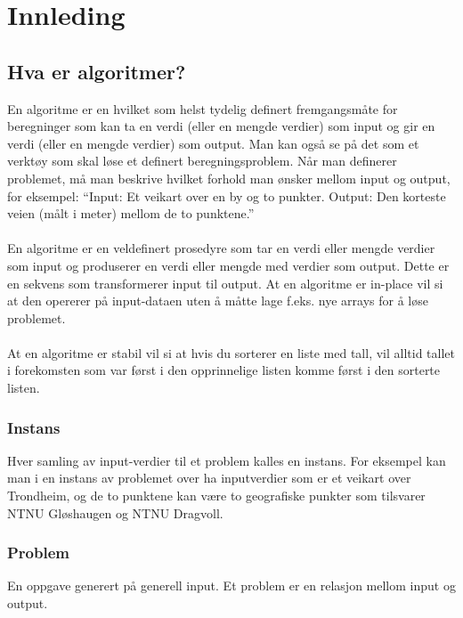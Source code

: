 \section{Innleding}
\newenvironment{boxed}
    {\begin{center}
    \begin{tabular}{|p{0.9\textwidth}|}
    \hline\\
    }
    { 
    \\\\\hline
    \end{tabular} 
    \end{center}
    }
\subsection{Hva er algoritmer?}
En algoritme er en hvilket som helst tydelig definert fremgangsmåte for beregninger som kan ta en verdi (eller en mengde verdier) som input og gir en verdi (eller en mengde verdier) som output. Man kan også se på det som et verktøy som skal løse et definert beregningsproblem. Når man definerer problemet, må man beskrive hvilket forhold man ønsker mellom input og output, for eksempel: “Input: Et veikart over en by og to punkter. Output: Den korteste veien (målt i meter) mellom de to punktene.”
\\\\
En algoritme er en veldefinert prosedyre som tar en verdi eller mengde verdier som input og produserer en verdi eller mengde med verdier som output. Dette er en sekvens som transformerer input til output.
At en algoritme er in-place vil si at den opererer på input-dataen uten å måtte lage f.eks. nye arrays for å løse problemet.
\\\\
At en algoritme er stabil vil si at hvis du sorterer en liste med tall, vil alltid tallet i forekomsten som var først i den opprinnelige listen komme først i den sorterte listen.

\subsubsection{Instans}
Hver samling av input-verdier til et problem kalles en instans. For eksempel kan man i en instans av problemet over ha inputverdier som er et veikart over Trondheim, og de to punktene kan være to geografiske punkter som tilsvarer NTNU Gløshaugen og NTNU Dragvoll.

\subsubsection{Problem}
En oppgave generert på generell input. Et problem er en relasjon mellom input og output.

